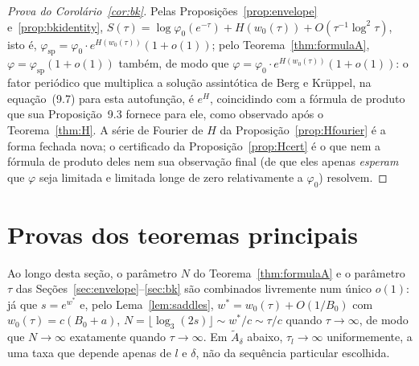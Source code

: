 \documentclass[11pt]{amsart}
\theoremstyle{plain}
\theoremstyle{definition}
\theoremstyle{remark}
\begin{document}
\begin{proof}[Prova do Corolário~\ref{cor:bk}]
Pelas Proposições~\ref{prop:envelope} e~\ref{prop:bkidentity}, $S(\tau) = \log\varphi_0(e^{-\tau}) +
H(w_0(\tau)) + O(\tau^{-1}\log^2\tau)$, isto é, $\varphi_{\mathrm{sp}} = \varphi_0\cdot
e^{H(w_0(\tau))}(1+o(1))$; pelo Teorema~\ref{thm:formulaA}, $\varphi=\varphi_{\mathrm{sp}}(1+o(1))$
também, de modo que $\varphi = \varphi_0\cdot e^{H(w_0(\tau))}(1+o(1))$: o fator periódico que
multiplica a solução assintótica de Berg e Kr\"uppel, na equação~(9.7) para esta autofunção, é
$e^H$, coincidindo com a fórmula de produto que sua Proposição~9.3 fornece para ele, como observado
após o Teorema~\ref{thm:H}. A série de Fourier de $H$ da Proposição~\ref{prop:Hfourier} é a forma
fechada nova; o certificado da Proposição~\ref{prop:Hcert} é o que nem a fórmula de produto deles
nem sua observação final (de que eles apenas \emph{esperam} que $\varphi$ seja limitada e limitada
longe de zero relativamente a $\varphi_0$) resolvem.
\end{proof}

\section{Provas dos teoremas principais}
\label{sec:proofs}

Ao longo desta seção, o parâmetro $N$ do Teorema~\ref{thm:formulaA} e o parâmetro $\tau$ das
Seções~\ref{sec:envelope}--\ref{sec:bk} são combinados livremente num único $o(1)$: já que
$s=e^{w^*}$ e, pelo Lema~\ref{lem:saddles}, $w^*=w_0(\tau)+O(1/B_0)$ com $w_0(\tau)=c(B_0+a)$,
$N=\lfloor\log_3(2s)\rfloor \sim w^*/c \sim \tau/c$ quando $\tau\to\infty$, de modo que
$N\to\infty$ exatamente quando $\tau\to\infty$. Em $\widetilde{A}_\delta$ abaixo, $\tau_l\to\infty$
uniformemente, a uma taxa que depende apenas de $l$ e $\delta$, não da sequência particular
escolhida.
\end{document}
